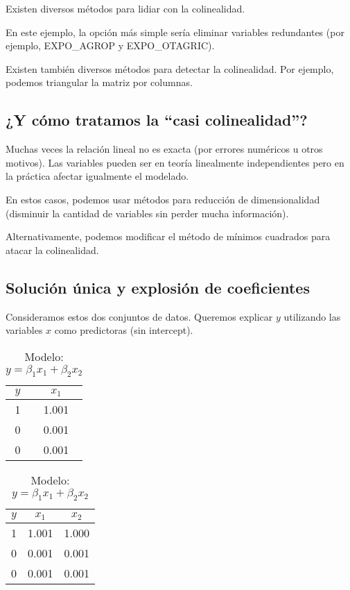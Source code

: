 \documentclass[a4paper]{article}
\begin{document}
Existen diversos métodos para lidiar con la colinealidad.

En este ejemplo, la opción más simple sería eliminar variables redundantes (por ejemplo, EXPO\_AGROP y EXPO\_OTAGRIC).

Existen también diversos métodos para detectar la colinealidad. Por ejemplo, podemos triangular la matriz por columnas.

\subsection{¿Y cómo tratamos la ``casi colinealidad''?}

Muchas veces la relación lineal no es exacta (por errores numéricos u otros motivos).
Las variables pueden ser en teoría linealmente independientes pero en la práctica afectar igualmente el modelado.

En estos casos, podemos usar métodos para reducción de dimensionalidad (disminuir la cantidad de variables sin perder mucha información).

Alternativamente, podemos modificar el método de mínimos cuadrados para atacar la colinealidad.

\subsection{Solución única y explosión de coeficientes}

Consideramos estos dos conjuntos de datos. Queremos explicar $y$ utilizando las variables $x$ como predictoras (sin intercept).

\vspace{-0.3cm}

\begin{table}[htbp]
\centering
\begin{minipage}{.5\textwidth}
  \centering
  \caption*{Modelo: $y = \beta_1 x_1$}
  \begin{tabular}{cc}
    \hline
    \( y \) & \( x_1 \) \\
    \hline
    1 & 1.001 \\
    0 & 0.001 \\
    0 & 0.001 \\
    \hline
  \end{tabular}
\end{minipage}%
\begin{minipage}{.5\textwidth}
  \centering
  \caption*{Modelo: $y = \beta_1 x_1 + \beta_2 x_2$}
  \begin{tabular}{ccc}
    \hline
    \( y \) & \( x_1 \) & \( x_2 \) \\
    \hline
    1 & 1.001 & 1.000 \\
    0 & 0.001 & 0.001 \\
    0 & 0.001 & 0.001 \\
    \hline
  \end{tabular}
\end{minipage}
\end{table}
\end{document}
